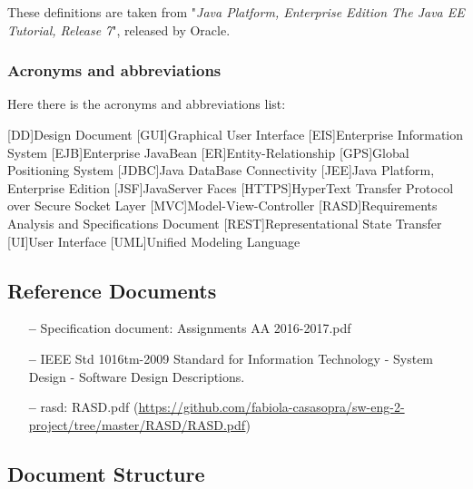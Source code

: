 These definitions are taken from "\textit{Java Platform, Enterprise Edition The Java EE Tutorial, Release 7}", released by Oracle.

\subsubsection{Acronyms and abbreviations } \label{acr}
Here there is the acronyms and abbreviations list:

\begin{acronym}[DD] %

[DD]{Design Document}
[GUI]{Graphical User Interface}
[EIS]{Enterprise Information System}
[EJB]{Enterprise JavaBean}
[ER]{Entity-Relationship}
[GPS]{Global Positioning System}
[JDBC]{Java DataBase Connectivity}
[JEE]{Java Platform, Enterprise Edition}
[JSF]{JavaServer Faces}
[HTTPS]{HyperText Transfer Protocol over Secure Socket Layer}
[MVC]{Model-View-Controller}
[RASD]{Requirements Analysis and Specifications Document}
[REST]{Representational State Transfer}
[UI]{User Interface}
[UML]{Unified Modeling Language}

\end{acronym}

\subsection{Reference Documents} \label{ref-doc}

\begin{itemize}
\item[\textbf{--}] Specification document: Assignments AA 2016-2017.pdf
\item[\textbf{--}] IEEE Std 1016tm-2009 Standard for Information Technology - System Design - Software Design Descriptions.
\item[\textbf{--}] \acl{rasd}: RASD.pdf 
\newline
(\url{https://github.com/fabiola-casasopra/sw-eng-2-project/tree/master/RASD/RASD.pdf})
\end{itemize}

\subsection{Document Structure} \label{doc-struct}

